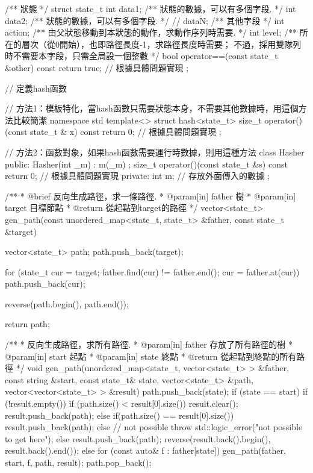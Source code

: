 \begin{Codex}[label=bfs_common.h]
/** 狀態 */
struct state_t {
    int data1;  /** 狀態的數據，可以有多個字段. */
    int data2;  /** 狀態的數據，可以有多個字段. */
    // dataN;   /** 其他字段 */
    int action; /** 由父狀態移動到本狀態的動作，求動作序列時需要. */
    int level;  /** 所在的層次（從0開始），也即路徑長度-1，求路徑長度時需要；
                    不過，採用雙隊列時不需要本字段，只需全局設一個整數 */
    bool operator==(const state_t &other) const {
        return true;  // 根據具體問題實現
    }
};

// 定義hash函數

// 方法1：模板特化，當hash函數只需要狀態本身，不需要其他數據時，用這個方法比較簡潔
namespace std {
template<> struct hash<state_t> {
    size_t operator()(const state_t & x) const {
        return 0; // 根據具體問題實現
    }
};
}

// 方法2：函數對象，如果hash函數需要運行時數據，則用這種方法
class Hasher {
public:
    Hasher(int _m) : m(_m) {};
    size_t operator()(const state_t &s) const {
        return 0; // 根據具體問題實現
    }
private:
    int m; // 存放外面傳入的數據
};

/**
 * @brief 反向生成路徑，求一條路徑.
 * @param[in] father 樹
 * @param[in] target 目標節點
 * @return 從起點到target的路徑
 */
vector<state_t> gen_path(const unordered_map<state_t, state_t> &father,
        const state_t &target) {
    vector<state_t> path;
    path.push_back(target);

    for (state_t cur = target; father.find(cur) != father.end(); 
            cur = father.at(cur))
        path.push_back(cur);

    reverse(path.begin(), path.end());

    return path;
}

/**
 * 反向生成路徑，求所有路徑.
 * @param[in] father 存放了所有路徑的樹
 * @param[in] start 起點
 * @param[in] state 終點
 * @return 從起點到終點的所有路徑
 */
void gen_path(unordered_map<state_t, vector<state_t> > &father,
        const string &start, const state_t& state, vector<state_t> &path,
        vector<vector<state_t> > &result) {
    path.push_back(state);
    if (state == start) {
        if (!result.empty()) {
            if (path.size() < result[0].size()) {
                result.clear();
                result.push_back(path);
            } else if(path.size() == result[0].size()) {
                result.push_back(path);
            } else {
                // not possible
                throw std::logic_error("not possible to get here");
            }
        } else {
            result.push_back(path);
        }
        reverse(result.back().begin(), result.back().end());
    } else {
        for (const auto& f : father[state]) {
            gen_path(father, start, f, path, result);
        }
    }
    path.pop_back();
}
\end{Codex}


